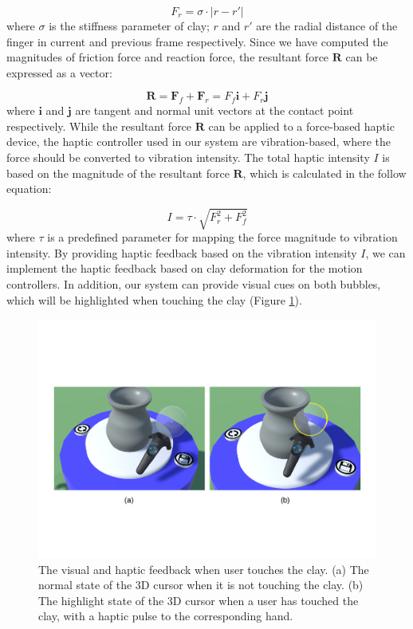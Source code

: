\documentclass{svjour3}                     %
\begin{document}
{\begin{equation}
F_{r} = \sigma \cdot |r - r'|
\end{equation}
where $\sigma$ is the stiffness parameter of clay; $r$ and $r'$ are the radial distance of the finger in current and previous frame respectively.
Since we have computed the magnitudes of friction force and reaction force, the resultant force $\mathbf{R}$ can be expressed as a vector:

\begin{equation}
\mathbf{R} = \mathbf{F}_{f} + \mathbf{F}_{r} = F_{f} \mathbf{i} + F_{r} \mathbf{j}
\end{equation}
where $\mathbf{i}$ and $\mathbf{j}$ are tangent and normal unit vectors at the contact point respectively.
While the resultant force $\mathbf{R}$ can be applied to a force-based haptic device, the haptic controller used in our system are vibration-based, where the force should be converted to vibration intensity.
The total haptic intensity $I$ is based on the magnitude of the resultant force $\mathbf{R}$, which is calculated in the follow equation:

\begin{equation}
I = \tau \cdot \sqrt{F_{r}^2 + F_{f}^2}
\end{equation}
where $\tau$ is a predefined parameter for mapping the force magnitude to vibration intensity.
By providing haptic feedback based on the vibration intensity $I$, we can implement the haptic feedback based on clay deformation for the motion controllers.
In addition, our system can provide visual cues on both bubbles, which will be highlighted when touching the clay (Figure \ref{fig:highlight}).

}

\begin{figure}
\includegraphics[width=\textwidth]{fig10}
\caption{The visual and haptic feedback when user touches the clay. (a) The normal state of the 3D cursor when it is not touching the clay. (b) The highlight state of the 3D cursor when a user has touched the clay, with a haptic pulse to the corresponding hand.}
\label{fig:highlight}
\end{figure}
\end{document}
